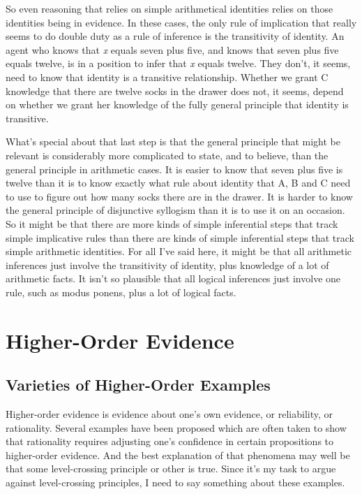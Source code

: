 So even reasoning that relies on simple arithmetical identities relies on those identities being in evidence. In these cases, the only rule of implication that really seems to do double duty as a rule of inference is the transitivity of identity. An agent who knows that \emph{x} equals seven plus five, and knows that seven plus five equals twelve, is in a position to infer that \emph{x} equals twelve. They don't, it seems, need to know that identity is a transitive relationship. Whether we grant C knowledge that there are twelve socks in the drawer does not, it seems, depend on whether we grant her knowledge of the fully general principle that identity is transitive.

What's special about that last step is that the general principle that might be relevant is considerably more complicated to state, and to believe, than the general principle in arithmetic cases. It is easier to know that seven plus five is twelve than it is to know exactly what rule about identity that A, B and C need to use to figure out how many socks there are in the drawer. It is harder to know the general principle of disjunctive syllogism than it is to use it on an occasion. So it might be that there are more kinds of simple inferential steps that track simple implicative rules than there are kinds of simple inferential steps that track simple arithmetic identities. For all I've said here, it might be that all arithmetic inferences just involve the transitivity of identity, plus knowledge of a lot of arithmetic facts. It isn't so plausible that all logical inferences just involve one rule, such as modus ponens, plus a lot of logical facts.

\chapter{Higher-Order Evidence}
\label{higher-orderevidence}

\section{Varieties of Higher-Order Examples}
\label{varietiesofhigher-orderexamples}

Higher-order evidence is evidence about one's own evidence, or reliability, or rationality. Several examples have been proposed which are often taken to show that rationality requires adjusting one's confidence in certain propositions to higher-order evidence. And the best explanation of that phenomena may well be that some level-crossing principle or other is true. Since it's my task to argue against level-crossing principles, I need to say something about these examples.

